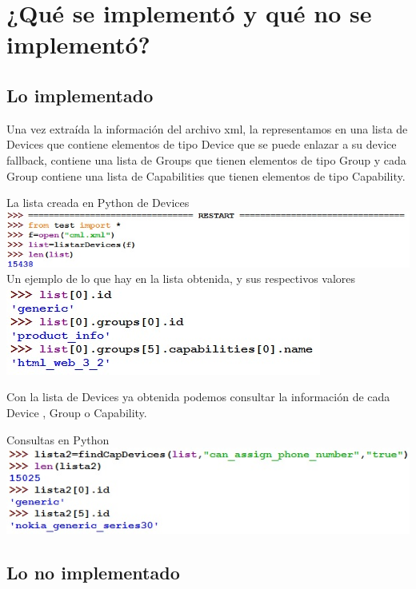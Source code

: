 \documentclass[11pt]{article} %
\begin{document}
\section{¿Qué se implementó y qué no se implementó? }
\subsection{Lo implementado} 
Una vez extraída la información del archivo xml, la representamos en una lista de Devices que contiene elementos de tipo Device que se puede enlazar a su device fallback, contiene una lista de Groups que tienen elementos de tipo Group y cada Group contiene una lista  de  Capabilities que tienen elementos de tipo Capability.
\begin{center}
La lista creada en Python de Devices
\includegraphics[scale=0.80]{Imagenes/3.jpg}
\\Un ejemplo de lo que hay en la lista obtenida, y sus respectivos valores
\includegraphics[scale=0.80]{Imagenes/4.jpg}
\end{center}
Con la lista de Devices ya obtenida podemos consultar la información de cada Device , Group o Capability. 
\begin{center}
Consultas en Python\\
\includegraphics[scale=0.80]{Imagenes/5.jpg}
\end{center}
\subsection{Lo no implementado} 
\end{document}
